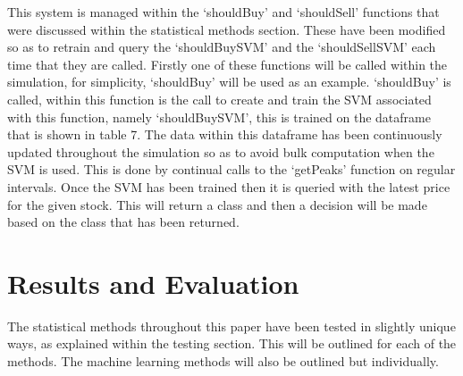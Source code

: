 \documentclass[12pt,a4paper]{article}
\begin{document}
This system is managed within the `shouldBuy' and `shouldSell' functions that were discussed within the statistical methods section. These have been modified so as to retrain and query the `shouldBuySVM' and the `shouldSellSVM' each time that they are called. Firstly one of these functions will be called within the simulation, for simplicity, `shouldBuy' will be used as an example. `shouldBuy' is called, within this function is the call to create and train the SVM associated with this function, namely `shouldBuySVM', this is trained on the dataframe that is shown in table 7. The data within this dataframe has been continuously updated throughout the simulation so as to avoid bulk computation when the SVM is used. This is done by continual calls to the `getPeaks' function on regular intervals. Once the SVM has been trained then it is queried with the latest price for the given stock. This will return a class and then a decision will be made based on the class that has been returned.

\iffalse
#################################################################################
\fi

\section{Results and Evaluation}

\iffalse
this section presents the results of the solutions.  It should include information on experimental settings.  The results should demonstrate the claimed benefits/disadvantages of the proposed solutions.
This section should be between 2 to 3 pages in length.

- Testing Criteria for each of the stat methods\\
- decision criteria for each of the peak trough methods\\
- input variables for the SVM - kernal etc \\
- conjunction test criteria for each of the good stat methods\\
- best stat method result possible\\
- best ml method result possible

This section should between 1 to 2 pages in length.
\fi

The statistical methods throughout this paper have been tested in slightly unique ways, as explained within the testing section. This will be outlined for each of the methods. The machine learning methods will also be outlined but individually.\\
\end{document}
